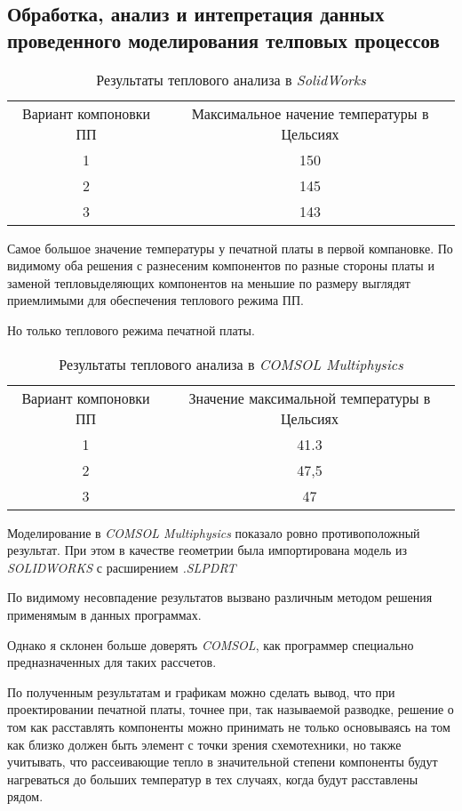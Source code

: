 \subsection{Обработка, анализ и интепретация данных проведенного моделирования телповых процессов}

\begin{table}[H]
  \centering
  \caption{Результаты теплового анализа в \textit{SolidWorks}}
\begin{tabular}{|c|c|}
\hline
  Вариант компоновки ПП & Максимальное начение температуры в Цельсиях \\
  1 &  150 \\
  2 &  145 \\
  3 &  143 \\
\hline
\end{tabular}
\end{table}

Самое большое значение температуры у печатной платы в первой компановке.
По видимому оба решения с разнесеним компонентов по разные стороны платы
и заменой тепловыделяющих компонентов на меньшие по размеру выглядят приемлимыми для обеспечения теплового режима ПП.

Но только теплового режима  печатной платы.

\begin{table}[H]
  \centering
  \caption{Результаты теплового анализа в \textit{COMSOL Multiphysics}}
\begin{tabular}{|c|c|}
\hline
  Вариант компоновки ПП & Значение максимальной температуры в Цельсиях \\
  1 & 41.3 \\
  2 & 47,5 \\
  3 & 47 \\
\hline
\end{tabular}
\end{table}

Моделирование в \textit{COMSOL Multiphysics} показало ровно противоположный результат. При этом в качестве геометрии была импортирована модель из \textit{SOLIDWORKS} с расширением \textit{.SLPDRT}

По видимому несовпадение результатов вызвано различным методом решения применямым в данных программах.

Однако я склонен больше доверять \textit{COMSOL}, как программер специально предназначенных для таких рассчетов.

По полученным результатам и графикам можно сделать вывод,
что при проектировании печатной платы, точнее при, так называемой разводке, решение о том как расставлять компоненты можно принимать
не только основываясь на том как близко должен быть элемент с точки зрения схемотехники, но также учитывать, что рассеивающие тепло в значительной степени компоненты будут нагреваться до больших температур в тех случаях, когда будут расставлены рядом.

\newpage
